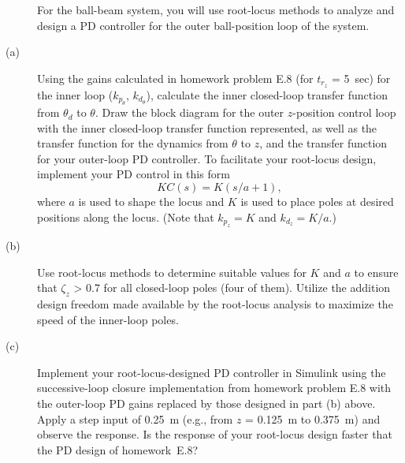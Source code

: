 \begin{description} \item[]
For the ball-beam system, you will use root-locus methods to analyze and design a PD controller for the outer ball-position loop of the system.
\item[(a)] Using the gains calculated in homework problem E.8 (for $t_{r_z}$ = 5~sec) for the inner loop ($k_{p_\theta}$, $k_{d_\theta}$), calculate the inner closed-loop transfer function from $\theta_d$ to $\theta$. Draw the block diagram for the outer $z$-position control loop with the inner closed-loop transfer function represented, as well as the transfer function for the dynamics from $\theta$ to $z$, and the transfer function for your outer-loop PD controller. To facilitate your root-locus design, implement your PD control in this form
    \[
    	KC(s) = K (s/a +1) ,
    \]
	where $a$ is used to shape the locus and $K$ is used to place poles at desired positions along the locus. (Note that $k_{p_z} = K$ and $k_{d_z} = K/a$.)
	
\item[(b)] Use root-locus methods to determine suitable values for $K$ and $a$ to ensure that $\zeta_z$ > 0.7 for all closed-loop poles (four of them). Utilize the addition design freedom made available by the root-locus analysis to maximize the speed of the inner-loop poles.

\item[(c)] Implement your root-locus-designed PD controller in Simulink using the successive-loop closure implementation from homework problem E.8 with the outer-loop PD gains replaced by those	designed in part (b) above. Apply a step input of 0.25~m (e.g., from $z$ = 0.125~m to 0.375~m) and observe the response. Is the response of your root-locus design faster that the PD design of homework~E.8?

\end{description}
